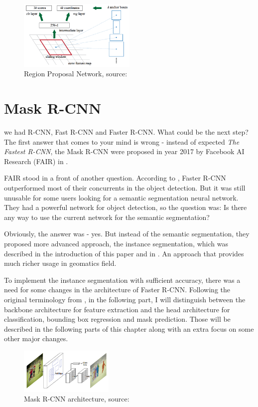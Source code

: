 \documentclass[journal, onecolumn, a4paper]{IEEEtran}
\begin{document}
\begin{figure}[h] \centering
	\includegraphics[width=0.5\textwidth]{fasterrcnn-anchors}
	\caption{Region Proposal Network, source: \cite{faster-rcnn}}
\end{figure}

\section{Mask R-CNN}
\label{network}

 we had R-CNN, Fast R-CNN and Faster R-CNN. What could be the next step? The first answer that comes to your mind is wrong - instead of expected \textit{The Fastest R-CNN}, the Mask R-CNN were proposed in year 2017 by Facebook AI Research (FAIR) in \cite{mask-rcnn}. 

FAIR stood in a front of another question. According to \cite{faster-rcnn}, Faster R-CNN outperformed most of their concurrents in the object detection. But it was still unusable for some users looking for a semantic segmentation neural network. They had a powerful network for object detection, so the question was: Is there any way to use the current network for the semantic segmentation? 

Obviously, the answer was - yes. But instead of the semantic segmentation, they proposed more advanced approach, the instance segmentation, which was described in the introduction of this paper and in \cite{mask-rcnn}. An approach that provides much richer usage in geomatics field. 

To implement the instance segmentation with sufficient accuracy, there was a need for some changes in the architecture of Faster R-CNN. Following the original terminology from \cite{mask-rcnn}, in the following part, I will distinguish between the backbone architecture for feature extraction and the head architecture for classification, bounding box regression and mask prediction. Those will be described in the following parts of this chapter along with an extra focus on some other major changes. 

\begin{figure}[h] \centering
	\includegraphics[width=0.4\textwidth]{maskrcnn}
	\caption{Mask R-CNN architecture, source: \cite{mask-rcnn}}
	\label{fig:mask-rcnn}
\end{figure}
\end{document}
